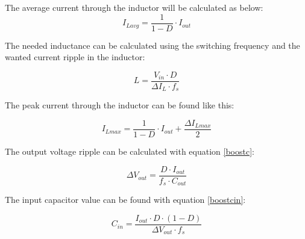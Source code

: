 \noindent The average current through the inductor will be calculated as below:
\begin{equation}
I_{Lavg} = \frac{1}{1-D}\cdot I_{out}
\end{equation}

\noindent The needed inductance can be calculated using the switching frequency and the wanted current ripple in the inductor:

\begin{equation}\label{boostind}
L = \frac{V_{in}\cdot D}{\Delta I_L \cdot f_s}
\end{equation}

\noindent The peak current through the inductor can be found like this:

\begin{equation}
I_{Lmax} = \frac{1}{1-D}\cdot I_{out}+\frac{\Delta I_{Lmax}}{2}
\end{equation}

\noindent The output voltage ripple can be calculated with equation \ref{boostc}\cite{boost_equation}:

\begin{equation}\label{boostc}
\Delta V_{out} = \frac{D\cdot I_{out}}{f_s \cdot C_{out}}
\end{equation} 

\noindent The input capacitor value can be found with equation \ref{boostcin}\cite{underthehood}:

\begin{equation} \label{boostcin}
C_{in} = \frac{I_{out}\cdot D\cdot (1-D)}{\Delta V_{out} \cdot f_s}
\end{equation}  
